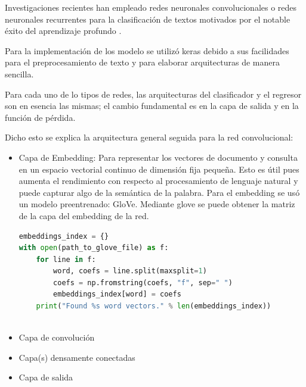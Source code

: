\documentclass[12pt]{article}
\begin{document}
Investigaciones recientes han empleado redes neuronales convolucionales o redes neuronales recurrentes para la clasificación de textos motivados por el notable éxito del aprendizaje profundo \cite{wu2017convolutional}.


Para la implementaci\'on de los modelo se utiliz\'o keras debido a sus facilidades para el preprocesamiento de texto y para elaborar arquitecturas de manera sencilla.

Para cada uno de lo tipos de redes, las arquitecturas del clasificador y el regresor son en esencia las mismas; el cambio fundamental es en la capa de salida y en la funci\'on de p\'erdida.

Dicho esto se explica la arquitectura general seguida para la red convolucional:
\begin{itemize}
	\item Capa de Embedding: Para representar los vectores de documento y consulta en un espacio vectorial continuo de dimensi\'on fija peque\~na. Esto es \'util pues aumenta el rendimiento con respecto al procesamiento de lenguaje natural y puede capturar algo de la sem\'antica de la palabra. Para el embedding se us\'o un modelo preentrenado: GloVe. Mediante glove se puede obtener la matriz de la capa del embedding de la red.
	
	 \begin{lstlisting}[frame=single, breaklines, language=Python] 
embeddings_index = {}
with open(path_to_glove_file) as f:
	for line in f:
		word, coefs = line.split(maxsplit=1)
		coefs = np.fromstring(coefs, "f", sep=" ")
		embeddings_index[word] = coefs
	print("Found %s word vectors." % len(embeddings_index))
	 
	 \end{lstlisting}
	
	\item Capa de convoluci\'on
	\item Capa(s) densamente conectadas
	\item Capa de salida
\end{itemize}
\end{document}
